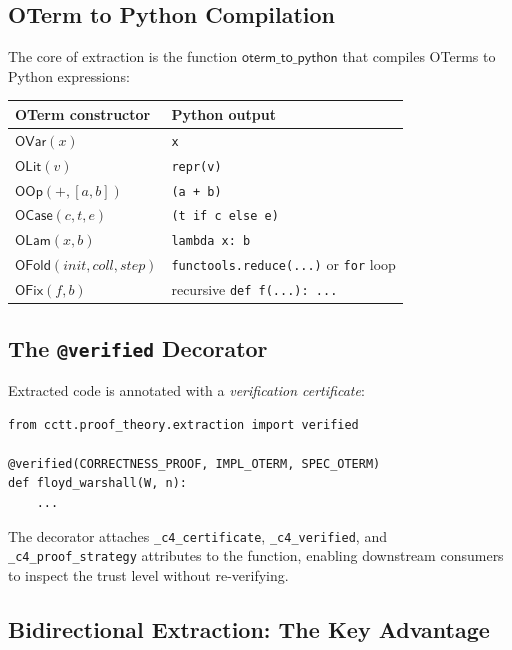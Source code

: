 \subsection{OTerm to Python Compilation}

The core of extraction is the function $\mathsf{oterm\_to\_python}$
that compiles OTerms to Python expressions:

\begin{center}
\begin{tabular}{ll}
\toprule
OTerm constructor & Python output \\
\midrule
$\mathsf{OVar}(x)$ & \texttt{x} \\
$\mathsf{OLit}(v)$ & \texttt{repr(v)} \\
$\mathsf{OOp}(+, [a, b])$ & \texttt{(a + b)} \\
$\mathsf{OCase}(c, t, e)$ & \texttt{(t if c else e)} \\
$\mathsf{OLam}(x, b)$ & \texttt{lambda x: b} \\
$\mathsf{OFold}(\mathit{init}, \mathit{coll}, \mathit{step})$ &
  \texttt{functools.reduce(...)} or \texttt{for} loop \\
$\mathsf{OFix}(f, b)$ & recursive \texttt{def f(...): ...} \\
\bottomrule
\end{tabular}
\end{center}

\subsection{The \texttt{@verified} Decorator}

Extracted code is annotated with a \emph{verification certificate}:

\begin{lstlisting}
from cctt.proof_theory.extraction import verified

@verified(CORRECTNESS_PROOF, IMPL_OTERM, SPEC_OTERM)
def floyd_warshall(W, n):
    ...
\end{lstlisting}

The decorator attaches \texttt{\_c4\_certificate},
\texttt{\_c4\_verified}, and \texttt{\_c4\_proof\_strategy}
attributes to the function, enabling downstream consumers to
inspect the trust level without re-verifying.

\subsection{Bidirectional Extraction: The Key Advantage}

